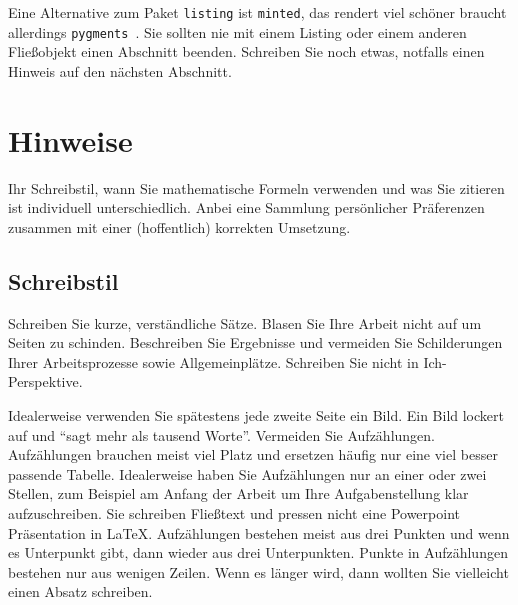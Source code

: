 \documentclass[11pt,a4paper]{report}
\begin{document}
Eine Alternative zum Paket \verb|listing| ist \verb|minted|, das
rendert viel schöner braucht allerdings
\texttt{pygments}~\cite{listings, minted, pygments}.
Sie sollten nie mit einem Listing oder einem anderen Fließobjekt 
einen Abschnitt beenden. 
Schreiben Sie noch etwas, 
notfalls einen Hinweis auf den nächsten Abschnitt.


\chapter{Hinweise} \label{chap:stil}

Ihr Schreibstil, wann Sie mathematische Formeln verwenden
und was Sie zitieren ist individuell unterschiedlich.
Anbei eine Sammlung persönlicher Präferenzen zusammen mit 
einer (hoffentlich) korrekten Umsetzung.


\section{Schreibstil} \label{sec:schreibstil}

Schreiben Sie kurze, verständliche Sätze.
Blasen Sie Ihre Arbeit nicht auf um Seiten zu schinden.
Beschreiben Sie Ergebnisse und vermeiden Sie Schilderungen
Ihrer Arbeitsprozesse sowie Allgemeinplätze. 
Schreiben Sie nicht in Ich-Perspektive.

Idealerweise verwenden Sie spätestens jede zweite Seite ein Bild. 
Ein Bild lockert auf und "`sagt mehr als tausend Worte"'.
Vermeiden Sie Aufzählungen.
Aufzählungen brauchen meist viel Platz  
und ersetzen häufig nur eine viel besser passende Tabelle.
Idealerweise haben Sie Aufzählungen nur an einer oder
zwei Stellen, zum Beispiel am Anfang der Arbeit um Ihre
Aufgabenstellung klar aufzuschreiben. 
Sie schreiben Fließtext und pressen nicht eine Powerpoint
Präsentation in \LaTeX.
Aufzählungen bestehen meist aus drei Punkten und wenn 
es Unterpunkt gibt, dann wieder aus drei Unterpunkten.
Punkte in Aufzählungen bestehen nur aus wenigen Zeilen.
Wenn es länger wird, dann wollten Sie vielleicht einen
Absatz schreiben.
\end{document}
